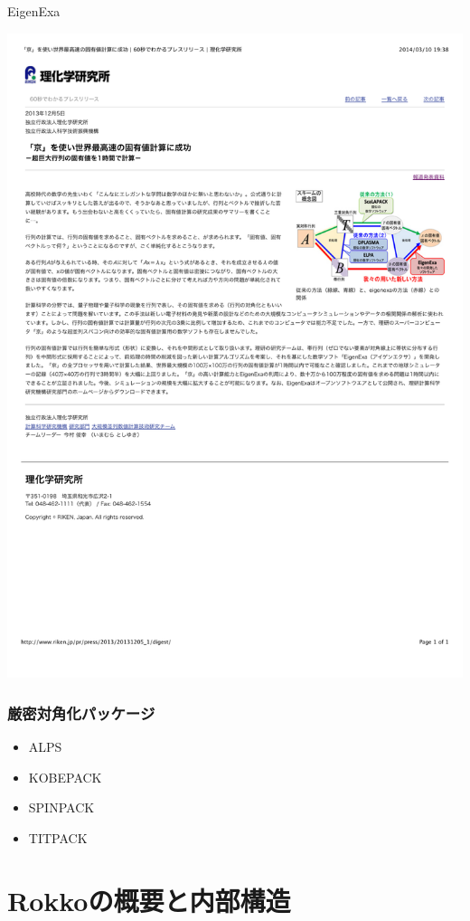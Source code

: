 \begin{frame}{EigenExa}
  \begin{center}
    \includegraphics[height=0.8\textheight]{figure/eigenexa.pdf}
  \end{center}
\end{frame}

\begin{frame}
  \frametitle{厳密対角化パッケージ}
  \begin{itemize}
  \item ALPS
  \item KOBEPACK
  \item SPINPACK
  \item TITPACK
  \end{itemize}
\end{frame}

\section{Rokkoの概要と内部構造}

